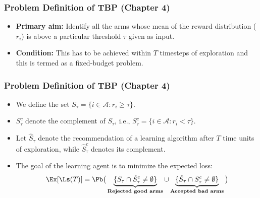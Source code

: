 \begin{frame}
\frametitle{Problem Definition of TBP ({Chapter 4})}
\begin{itemize}
\item<1-> \textbf{Primary aim:} Identify all the arms whose mean of the reward distribution ($r_i$) is above a particular threshold $\tau$ given as input.
\item<2-> \textbf{Condition:} This has to be achieved within $T$ timesteps of exploration and this is termed as a fixed-budget problem.
\end{itemize}
\end{frame}

\begin{frame}
\frametitle{Problem Definition of TBP ({Chapter 4})}
\begin{itemize}
\item<1-> We define the set $S_{\tau}=\lbrace i\in \mathcal{A}: r_{i}\geq \tau \rbrace$. 
\item<2-> $S_\tau^c$ denote the complement of $S_\tau$, i.e.,  $S_{\tau}^{c}=\lbrace i\in \mathcal{A}: r_{i} < \tau \rbrace$. 
\item<3-> Let $\hat{S}_{\tau}$ denote the recommendation of a learning algorithm after $T$ time units of exploration, while $\hat{S}_{\tau}^c$ denotes its complement.


\item<4-> The goal of the learning agent is to minimize the expected loss:
\begin{align*}
\Ex[\Ls(T)] &= \Pb\big(\underbrace{\lbrace S_{\tau}\cap \hat{S}_{\tau}^{c} \neq \emptyset \rbrace}_{\textbf{Rejected good arms}}  \cup   \underbrace{\lbrace \hat{S}_{\tau}\cap S_{\tau}^{c} \neq \emptyset\rbrace}_{\textbf{Accepted bad arms}}\big) \\
\end{align*}
\end{itemize}
\end{frame}

